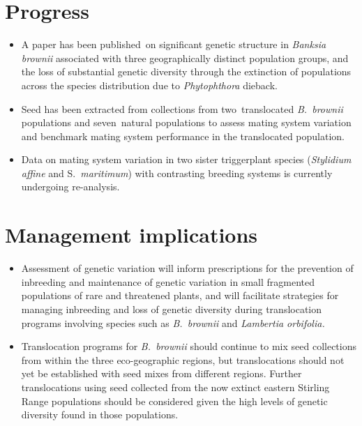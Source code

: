 \documentclass[version=last,
    paper=a4, %
    10pt, %
    usenames,
    dvipsnames,
    oneside, %
    headings=openany, %
    DIV=15 %
]{scrbook}
\begin{document}
\section*{Progress}
\begin{itemize}
\itemsep1pt\parskip0pt
\item
  A paper has been published~on significant genetic structure in
  \emph{Banksia brownii} associated with three geographically distinct
  population groups, and the loss of substantial genetic diversity
  through the extinction of populations across the species distribution
  due to \emph{Phytophthora} dieback.
\item
  Seed has been extracted from collections from two~translocated
  \emph{B.~brownii} populations and seven~natural populations to assess
  mating system variation and benchmark mating system performance in the
  translocated population.
\item
  Data on mating system variation in two sister triggerplant species
  (\emph{Stylidium affine} and S.~\emph{maritimum}) with contrasting
  breeding systems is currently undergoing re-analysis.
\end{itemize}



\section*{Management implications}
\begin{itemize}
\itemsep1pt\parskip0pt
\item
  Assessment of genetic variation will inform prescriptions for the
  prevention of inbreeding and maintenance of genetic variation in small
  fragmented populations of rare and threatened plants, and will
  facilitate strategies for managing inbreeding and loss of genetic
  diversity during translocation programs involving species such as
  \emph{B.~brownii} and \emph{Lambertia orbifolia.}
\item
  Translocation programs for \emph{B.~brownii} should continue to mix
  seed collections from within the three eco-geographic regions, but
  translocations should not yet be established with seed mixes from
  different regions. Further translocations using seed collected from
  the now extinct eastern Stirling Range populations should be
  considered given the high levels of genetic diversity found in those
  populations.
\end{itemize}
\end{document}
